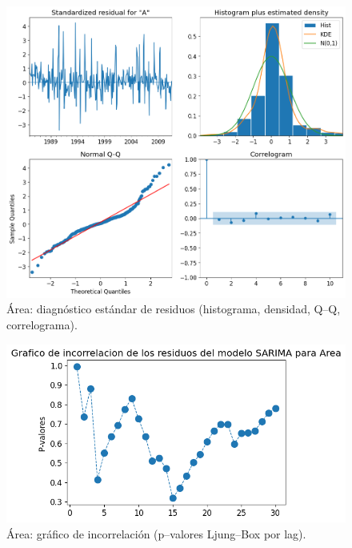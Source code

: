 \begin{figure}[H]\centering
\includegraphics[scale=.52]{Figures/res_std_area.png}
\caption{Área: diagnóstico estándar de residuos (histograma, densidad, Q--Q, correlograma).}
\label{fig:std_area}
\end{figure}

\begin{figure}[H]\centering
\includegraphics[scale=.52]{Figures/inco_area.png}
\caption{Área: gráfico de incorrelación (p--valores Ljung--Box por lag).}
\label{fig:inco_area}
\end{figure}

